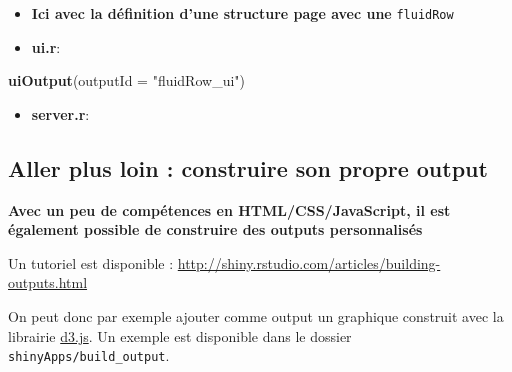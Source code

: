 \documentclass[
]{article}
\newenvironment{Shaded}{\begin{snugshade}}{\end{snugshade}}
\newcommand{\AttributeTok}[1]{\textcolor[rgb]{0.13,0.29,0.53}{#1}}
\newcommand{\DecValTok}[1]{\textcolor[rgb]{0.00,0.00,0.81}{#1}}
\newcommand{\FunctionTok}[1]{\textcolor[rgb]{0.13,0.29,0.53}{\textbf{#1}}}
\newcommand{\NormalTok}[1]{#1}
\newcommand{\OtherTok}[1]{\textcolor[rgb]{0.56,0.35,0.01}{#1}}
\newcommand{\SpecialCharTok}[1]{\textcolor[rgb]{0.81,0.36,0.00}{\textbf{#1}}}
\newcommand{\StringTok}[1]{\textcolor[rgb]{0.31,0.60,0.02}{#1}}
\providecommand{\tightlist}{%
  \setlength{\itemsep}{0pt}\setlength{\parskip}{0pt}}
\begin{document}
\begin{itemize}
\item
  \textbf{Ici avec la définition d'une structure page avec une}
  \texttt{fluidRow}
\item
  \textbf{ui.r}:
\end{itemize}

\begin{Shaded}
\begin{Highlighting}[]
\FunctionTok{uiOutput}\NormalTok{(}\AttributeTok{outputId =} \StringTok{"fluidRow\_ui"}\NormalTok{)}
\end{Highlighting}
\end{Shaded}

\begin{itemize}
\tightlist
\item
  \textbf{server.r}:
\end{itemize}

\begin{Shaded}
\end{Shaded}

\hypertarget{aller-plus-loin-construire-son-propre-output}{%
\subsection{Aller plus loin : construire son propre
output}\label{aller-plus-loin-construire-son-propre-output}}

\textbf{Avec un peu de compétences en HTML/CSS/JavaScript, il est
également possible de construire des outputs personnalisés}

Un tutoriel est disponible :
\url{http://shiny.rstudio.com/articles/building-outputs.html}

On peut donc par exemple ajouter comme output un graphique construit
avec la librairie \href{https://d3js.org/}{d3.js}. Un exemple est
disponible dans le dossier \texttt{shinyApps/build\_output}.
\end{document}
